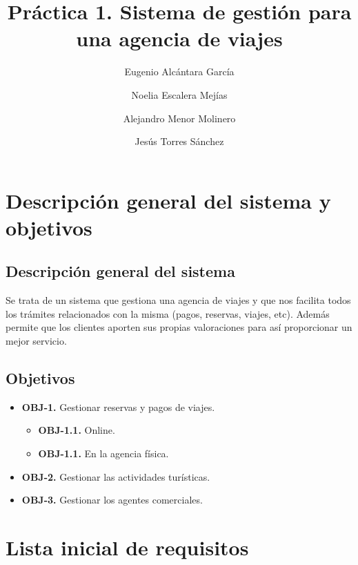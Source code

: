 \documentclass{article}
\title{Práctica 1. Sistema de gestión para una agencia de viajes}
\author{Eugenio Alcántara García\\
		\and Noelia Escalera Mejías\\
		\and Alejandro Menor Molinero\\
		\and Jesús Torres Sánchez}
\begin{document}
	\maketitle
	\section{Descripción general del sistema y objetivos}
	\subsection{Descripción general del sistema}
	Se trata de un sistema que gestiona una agencia de viajes y que nos facilita todos los trámites relacionados con la misma (pagos, reservas, viajes, etc). Además permite que los clientes aporten sus propias valoraciones para así proporcionar un mejor servicio.
	\subsection{Objetivos}
	\begin{itemize}
		\item \textbf{OBJ-1.} Gestionar reservas y pagos de viajes.
		\begin{itemize}
			\item \textbf{OBJ-1.1.} Online.
			\item \textbf{OBJ-1.1.} En la agencia física.
		\end{itemize}
		\item \textbf{OBJ-2.} Gestionar las actividades turísticas.
		\item \textbf{OBJ-3.} Gestionar los agentes comerciales.	
	\end{itemize}
	\section{Lista inicial de requisitos}
\end{document}
